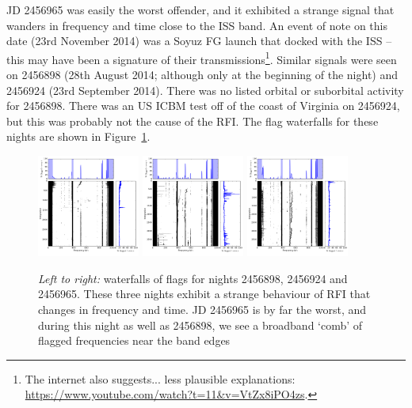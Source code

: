 JD 2456965 was easily the worst offender, and it exhibited a strange signal that wanders in frequency and time close to the ISS band. An event of note on this date (23rd November 2014) was a Soyuz FG launch that docked with the ISS -- this may have been a signature of their transmissions\footnote{The internet also suggests... less plausible explanations: \url{https://www.youtube.com/watch?t=11&v=VtZx8iPO4zs}. }.
Similar signals were seen on 2456898 (28th August 2014; although only at the beginning of the night) and 2456924 (23rd September 2014). There was no listed orbital or suborbital activity for 2456898. There was an US ICBM test off of the coast of Virginia on 2456924, but this was probably not the cause of the RFI. The flag waterfalls for these nights are shown in Figure~\ref{fig:rfi_psa128_wandering}.

\begin{figure}[h!]
\centering
\includegraphics[width=0.3\textwidth]{chapters/data_processing/figures/2456898RFI.png}
\includegraphics[width=0.3\textwidth]{chapters/data_processing/figures/2456924RFI.png}
\includegraphics[width=0.3\textwidth]{chapters/data_processing/figures/2456965RFI.png}
\caption[Waterfalls of RFI flags for nights 2456898, 2456924 and 2456965]{\textit{Left to right:} waterfalls of flags for nights 2456898, 2456924 and 2456965. These three nights exhibit a strange behaviour of RFI that changes in frequency and time. JD 2456965 is by far the worst, and during this night as well as 2456898, we see a broadband `comb' of flagged frequencies near the band edges}
\label{fig:rfi_psa128_wandering}
\end{figure}

